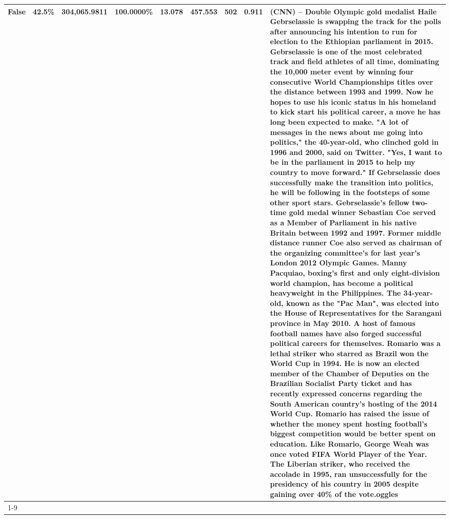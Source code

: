 \begin{table}[H]
{\begin{tabular}{lllrlllll}
False & 42.5\% & 304,065.9811 & \bfseries \color{red} 100.0000\% & \bfseries \color{red} 13.078 & 457.553 & 502 & 0.911 & (CNN) -- Double Olympic gold medalist Haile Gebrselassie is swapping the track for the polls after announcing his intention to run for election to the Ethiopian parliament in 2015. Gebrselassie is one of the most celebrated track and field athletes of all time, dominating the 10,000 meter event by winning four consecutive World Championships titles over the distance between 1993 and 1999. Now he hopes to use his iconic status in his homeland to kick start his political career, a move he has long been expected to make. "A lot of messages in the news about me going into politics," the 40-year-old, who clinched gold in 1996 and 2000, said on Twitter. "Yes, I want to be in the parliament in 2015 to help my country to move forward." If Gebrselassie does successfully make the transition into politics, he will be following in the footsteps of some other sport stars. Gebrselassie's fellow two-time gold medal winner Sebastian Coe served as a Member of Parliament in his native Britain between 1992 and 1997. Former middle distance runner Coe also served as chairman of the organizing committee's for last year's London 2012 Olympic Games. Manny Pacquiao, boxing's first and only eight-division world champion, has become a political heavyweight in the Philippines. The 34-year-old, known as the "Pac Man", was elected into the House of Representatives for the Sarangani province in May 2010. A host of famous football names have also forged successful political careers for themselves. Romario was a lethal striker who starred as Brazil won the World Cup in 1994. He is now an elected member of the Chamber of Deputies on the Brazilian Socialist Party ticket and has recently expressed concerns regarding the South American country's hosting of the 2014 World Cup. Romario has raised the issue of whether the money spent hosting football's biggest competition would be better spent on education. Like Romario, George Weah was once voted FIFA World Player of the Year. The Liberian striker, who received the accolade in 1995, ran unsuccessfully for the presidency of his country in 2005 despite gaining over 40\% of the vote.oggles \\
\cline{1-9}

\end{tabular}}
\end{table}
